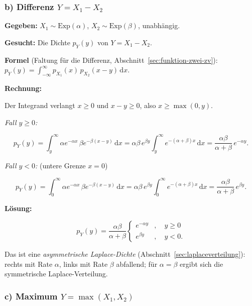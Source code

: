 \subsubsection*{b) Differenz $Y = X_1 - X_2$}

\begin{beispiel}[Funktion zweier Zufallsvariablen -- $Y = X_1 - X_2$]

\textbf{Gegeben:} $X_1 \sim \text{Exp}(\alpha)$, $X_2 \sim \text{Exp}(\beta)$,
unabhängig.

\textbf{Gesucht:} Die Dichte $p_Y(y)$ von $Y = X_1 - X_2$.

\textbf{Formel} (Faltung für die Differenz,
Abschnitt~\ref{sec:funktion-zwei-zv}):
$p_Y(y) = \int_{-\infty}^{\infty} p_{X_1}(x)\, p_{X_2}(x - y)\,\mathrm{d}x$.

\textbf{Rechnung:}

Der Integrand verlangt $x \geq 0$ und $x - y \geq 0$, also
$x \geq \max(0, y)$.

\emph{Fall $y \geq 0$:}

$$
p_Y(y) = \int_{y}^{\infty} \alpha e^{-\alpha x}\,\beta e^{-\beta(x-y)}\,\mathrm{d}x
= \alpha\beta\, e^{\beta y}\int_{y}^{\infty} e^{-(\alpha+\beta)x}\,\mathrm{d}x
= \frac{\alpha\beta}{\alpha+\beta}\, e^{-\alpha y}.
$$

\emph{Fall $y < 0$:} (untere Grenze $x = 0$)

$$
p_Y(y) = \int_{0}^{\infty} \alpha e^{-\alpha x}\,\beta e^{-\beta(x-y)}\,\mathrm{d}x
= \alpha\beta\, e^{\beta y}\int_{0}^{\infty} e^{-(\alpha+\beta)x}\,\mathrm{d}x
= \frac{\alpha\beta}{\alpha+\beta}\, e^{\beta y}.
$$

\textbf{Lösung:}

$$
\boxed{\;p_Y(y) = \frac{\alpha\beta}{\alpha+\beta}
\begin{cases} e^{-\alpha y} & , \quad y \geq 0 \\[4pt]
e^{\beta y} & , \quad y < 0. \end{cases}\;}
$$

Das ist eine \emph{asymmetrische Laplace-Dichte}
(Abschnitt~\ref{sec:laplaceverteilung}): rechts mit Rate $\alpha$, links mit
Rate $\beta$ abfallend; für $\alpha = \beta$ ergibt sich die symmetrische
Laplace-Verteilung.

\end{beispiel}

\subsubsection*{c) Maximum $Y = \max(X_1, X_2)$}


